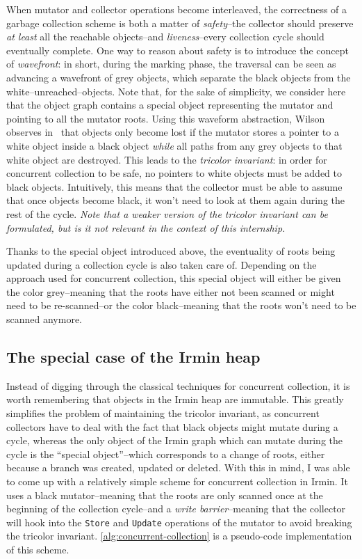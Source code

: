 When mutator and collector operations become interleaved, the correctness of a garbage collection scheme is both a matter of \emph{safety}--the collector should preserve \emph{at least} all the reachable objects--and \emph{liveness}--every collection cycle should eventually complete. One way to reason about safety is to introduce the concept of \emph{wavefront}: in short, during the marking phase, the traversal can be seen as advancing a wavefront of grey objects, which separate the black objects from the white--unreached--objects. Note that, for the sake of simplicity, we consider here that the object graph contains a special object representing the mutator and pointing to all the mutator roots. Using this waveform abstraction, Wilson observes in~\cite{wilson94} that objects only become lost if the mutator stores a pointer to a white object inside a black object \emph{while} all paths from any grey objects to that white object are destroyed. This leads to the \emph{tricolor invariant}: in order for concurrent collection to be safe, no pointers to white objects must be added to black objects. Intuitively, this means that the collector must be able to assume that once objects become black, it won't need to look at them again during the rest of the cycle. \emph{Note that a weaker version of the tricolor invariant can be formulated, but is it not relevant in the context of this internship.}

Thanks to the special object introduced above, the eventuality of roots being updated during a collection cycle is also taken care of. Depending on the approach used for concurrent collection, this special object will either be given the color grey--meaning that the roots have either not been scanned or might need to be re-scanned--or the color black--meaning that the roots won't need to be scanned anymore.

\subsection{The special case of the Irmin heap}

Instead of digging through the classical techniques for concurrent collection, it is worth remembering that objects in the Irmin heap are immutable. This greatly simplifies the problem of maintaining the tricolor invariant, as concurrent collectors have to deal with the fact that black objects might mutate during a cycle, whereas the only object of the Irmin graph which can mutate during the cycle is the ``special object''--which corresponds to a change of roots, either because a branch was created, updated or deleted. With this in mind, I was able to come up with a relatively simple scheme for concurrent collection in Irmin. It uses a black mutator--meaning that the roots are only scanned once at the beginning of the collection cycle--and a \emph{write barrier}--meaning that the collector will hook into the \texttt{Store} and \texttt{Update} operations of the mutator to avoid breaking the tricolor invariant. \cref{alg:concurrent-collection} is a pseudo-code implementation of this scheme.

